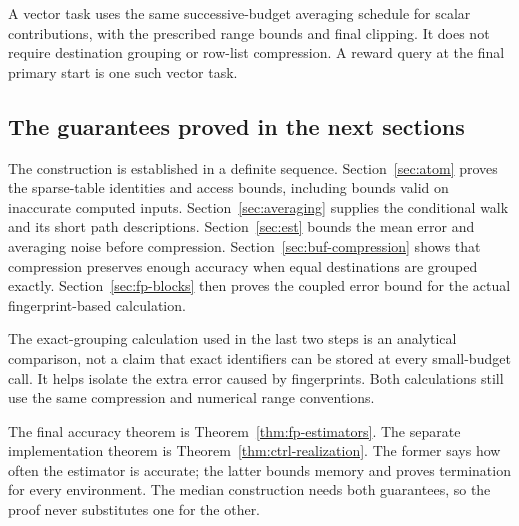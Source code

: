 A vector task uses the same successive-budget averaging schedule for scalar contributions, with the prescribed range bounds and final clipping. It does not require destination grouping or row-list compression. A reward query at the final primary start is one such vector task.

\subsection{The guarantees proved in the next sections}

The construction is established in a definite sequence. Section~\ref{sec:atom} proves the sparse-table identities and access bounds, including bounds valid on inaccurate computed inputs. Section~\ref{sec:averaging} supplies the conditional walk and its short path descriptions. Section~\ref{sec:est} bounds the mean error and averaging noise before compression. Section~\ref{sec:buf-compression} shows that compression preserves enough accuracy when equal destinations are grouped exactly. Section~\ref{sec:fp-blocks} then proves the coupled error bound for the actual fingerprint-based calculation.

The exact-grouping calculation used in the last two steps is an analytical comparison, not a claim that exact identifiers can be stored at every small-budget call. It helps isolate the extra error caused by fingerprints. Both calculations still use the same compression and numerical range conventions.

The final accuracy theorem is Theorem~\ref{thm:fp-estimators}. The separate implementation theorem is Theorem~\ref{thm:ctrl-realization}. The former says how often the estimator is accurate; the latter bounds memory and proves termination for every environment. The median construction needs both guarantees, so the proof never substitutes one for the other.
